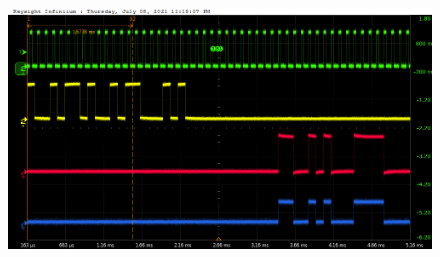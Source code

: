 \documentclass[aspectratio=169]{beamer}
\begin{document}
\begin{frame}
\begin{columns}
\begin{center}
\begin{figure}
				\caption{}
			\end{figure}
			\begin{figure}
				\includegraphics[width=0.95 \textwidth]{IMG/probe/09-08-2021_ch05-read60-baselinedac1.png}
				\caption{}
			\end{figure}	
		\end{center}
	\end{columns}
		\end{frame}
	
\end{document}
